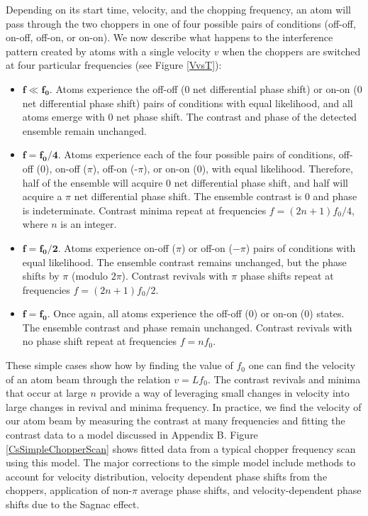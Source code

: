 Depending on its start time, velocity, and the chopping frequency, an atom will pass through the two choppers in one of four possible pairs of conditions (off-off, on-off, off-on, or on-on). We now describe what happens to the interference pattern created by atoms with a single velocity $v$ when the choppers are switched at four particular frequencies (see Figure \ref{VvsT}):
\begin{itemize}
\item $\bm{f \ll f}\bm{_0}.$ Atoms experience the off-off (0 net differential phase shift) or on-on (0 net differential phase shift) pairs of conditions with equal likelihood, and all atoms emerge with 0 net phase shift. The contrast and phase of the detected ensemble remain unchanged.

\item $\bm{f=f}\bm{_0/4}$. Atoms experience each of the four possible pairs of conditions, off-off (0), on-off ($\pi$), off-on (-$\pi$), or on-on (0), with equal likelihood. Therefore, half of the ensemble will acquire 0 net differential phase shift, and half will acquire a $\pi$ net differential phase shift. The ensemble contrast is 0 and phase is indeterminate. Contrast minima repeat at frequencies $f=(2n+1)f_0/4$, where $n$ is an integer. 

\item $\bm{f=f}\bm{_0/2}$. Atoms experience on-off ($\pi$) or off-on ($-\pi$) pairs of conditions with equal likelihood. The ensemble contrast remains unchanged, but the phase shifts by $\pi$ (modulo $2\pi$). Contrast revivals with $\pi$ phase shifts repeat at frequencies $f=(2n+1)f_0/2$. 

\item $\bm{f=f}\bm{_0}$. Once again, all atoms experience the off-off (0) or on-on (0) states. The ensemble contrast and phase remain unchanged. Contrast revivals with no phase shift repeat at frequencies $f=nf_0$.
\end{itemize}

These simple cases show how by finding the value of $f_0$ one can find the velocity of an atom beam through the relation $v=Lf_0$. The contrast revivals and minima that occur at large $n$ provide a way of leveraging small changes in velocity into large changes in revival and minima frequency. In practice, we find the velocity of our atom beam by measuring the contrast at many frequencies and fitting the contrast data to a model discussed in Appendix B. Figure \ref{CsSimpleChopperScan} shows fitted data from a typical chopper frequency scan using this model. The major corrections to the simple model include methods to account for velocity distribution, velocity dependent phase shifts from the choppers, application of non-$\pi$ average phase shifts, and velocity-dependent phase shifts due to the Sagnac effect.


